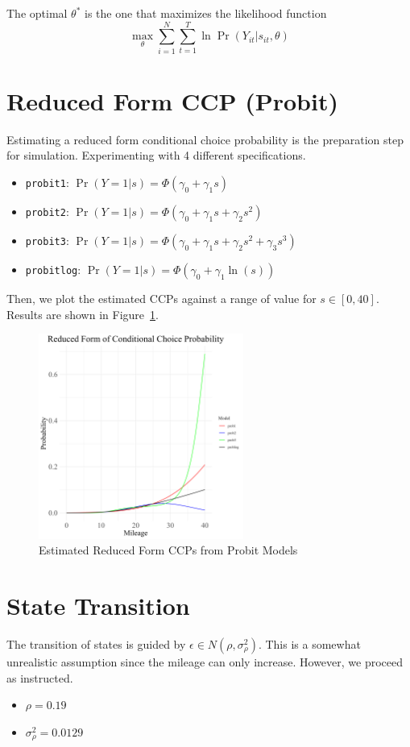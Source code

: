 \documentclass[12pt]{article}[margin=1in]
\begin{document}
The optimal $\theta^*$ is the one that maximizes the likelihood function
\begin{equation}\label{eq:likelihood}
    \max_{\theta} \sum_{i=1}^N \sum_{t=1}^T \ln \Pr(Y_{it}|s_{it},\theta)
\end{equation}

\section{Reduced Form CCP (Probit)}

Estimating a reduced form conditional choice probability is the preparation
step for simulation. Experimenting with 4 different specifications.
\begin{itemize}
    \item \verb|probit1|: $\Pr(Y=1|s) = \Phi(\gamma_0 + \gamma_1 s)$
    \item \verb|probit2|: $\Pr(Y=1|s) = \Phi(\gamma_0 + \gamma_1 s + \gamma_2 s^2)$
    \item \verb|probit3|: $\Pr(Y=1|s) = \Phi(\gamma_0 + \gamma_1 s + \gamma_2 s^2 + \gamma_3 s^3)$
    \item \verb|probitlog|: $\Pr(Y=1|s) = \Phi(\gamma_0 + \gamma_1 \ln(s))$
\end{itemize}
Then, we plot the estimated CCPs against a range of value for $s\in[0,40]$. Results are shown in Figure~\ref{fig:ccp_probit}.
\begin{figure}[!htbp]
    \centering
    \includegraphics[width=0.6\textwidth]{../Figures/ccp_probit.png}
    \caption{Estimated Reduced Form CCPs from Probit Models}
    \label{fig:ccp_probit}
\end{figure}

\section{State Transition}
The transition of states is guided by $\epsilon\in N(\rho, \sigma_{\rho}^2)$.
This is a somewhat unrealistic assumption since the mileage can only increase.
However, we proceed as instructed.
\begin{itemize}
    \item $\rho=0.19$
    \item $\sigma_{\rho}^2=0.0129$
\end{itemize}
\end{document}
